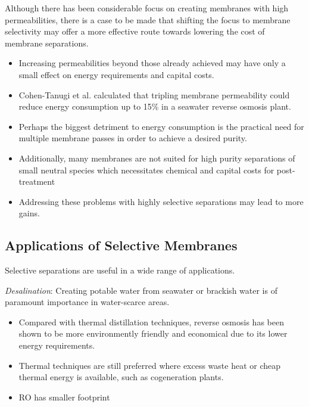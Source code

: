   Although there has been considerable focus on creating membranes with high
  permeabilities, there is a case to be made that shifting the focus to membrane
  selectivity may offer a more effective route towards lowering the cost of 
  membrane separations.
  \begin{itemize}
    \item Increasing permeabilities beyond those already achieved may have 
    only a small effect on energy requirements and capital costs. 
    \item Cohen-Tanugi et al. calculated that tripling membrane permeability
    could reduce energy consumption up to 15\% in a seawater reverse osmosis plant.~\cite{cohen-tanugi_quantifying_2014}
    \item Perhaps the biggest detriment to energy consumption is the practical
	need for multiple membrane passes in order to achieve a desired purity.
    \item Additionally, many membranes are not suited for high purity separations
    of small neutral species which necessitates chemical and capital costs for
    post-treatment
    \item Addressing these problems with highly selective separations may lead to 
    more gains.
 \end{itemize} 
  
  
  \subsection{Applications of Selective Membranes}
  
  Selective separations are useful in a wide range of applications.  
  
  \textit{Desalination}:
  Creating potable water from seawater or brackish water is of paramount importance
  in water-scarce areas. 
  \begin{itemize}
  	\item Compared with thermal distillation techniques, reverse osmosis has been 
  	shown to be more environmently friendly and economical due to its lower energy
  	requirements.\cite{morton_environmental_1996}
  	\item Thermal techniques are still preferred where excess waste heat or cheap 
  	thermal energy is available, such as cogeneration plants.\cite{bhojwani_technology_2019}
  	\item RO has smaller footprint %
  \end{itemize}

